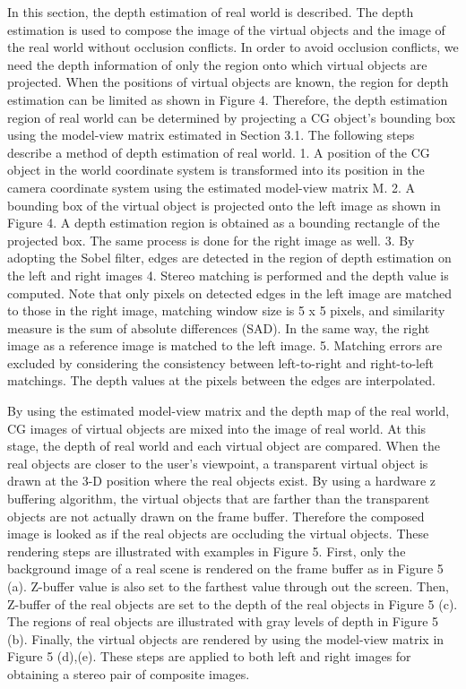 In this section, the depth estimation of real world is described.
The depth estimation is used to compose the image
of the virtual objects and the image of the real world without
occlusion conflicts. In order to avoid occlusion conflicts, we
need the depth information of only the region onto which
virtual objects are projected. When the positions of virtual
objects are known, the region for depth estimation can be
limited as shown in Figure 4. Therefore, the depth estimation
region of real world can be determined by projecting
a CG object’s bounding box using the model-view matrix
estimated in Section 3.1. The following steps describe a
method of depth estimation of real world.
1. A position of the CG object in the world coordinate
system is transformed into its position in the camera
coordinate system using the estimated model-view matrix
M.
2. A bounding box of the virtual object is projected onto
the left image as shown in Figure 4. A depth estimation
region is obtained as a bounding rectangle of the
projected box. The same process is done for the right
image as well.
3. By adopting the Sobel filter, edges are detected in the
region of depth estimation on the left and right images
4. Stereo matching is performed and the depth value is
computed. Note that only pixels on detected edges in
the left image are matched to those in the right image,
matching window size is 5 x 5 pixels, and similarity
measure is the sum of absolute differences (SAD). In
the same way, the right image as a reference image is
matched to the left image.
5. Matching errors are excluded by considering the consistency
between left-to-right and right-to-left matchings.
The depth values at the pixels between the edges
are interpolated.

By using the estimated model-view matrix and the depth
map of the real world, CG images of virtual objects are
mixed into the image of real world. At this stage, the depth
of real world and each virtual object are compared. When
the real objects are closer to the user’s viewpoint, a transparent
virtual object is drawn at the 3-D position where the
real objects exist. By using a hardware z buffering algorithm,
the virtual objects that are farther than the transparent
objects are not actually drawn on the frame buffer. Therefore
the composed image is looked as if the real objects are
occluding the virtual objects. These rendering steps are illustrated
with examples in Figure 5.
First, only the background image of a real scene is rendered
on the frame buffer as in Figure 5 (a). Z-buffer value
is also set to the farthest value through out the screen. Then,
Z-buffer of the real objects are set to the depth of the real
objects in Figure 5 (c). The regions of real objects are illustrated
with gray levels of depth in Figure 5 (b). Finally, the
virtual objects are rendered by using the model-view matrix
in Figure 5 (d),(e). These steps are applied to both left and right images for obtaining a stereo pair of composite
images.

